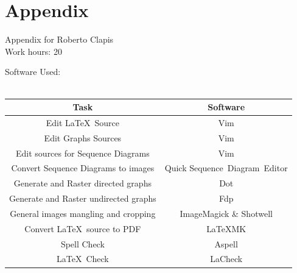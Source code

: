 \documentclass{article}
\begin{document}
\section{Appendix}
Appendix for Roberto Clapis\\
Work hours: 20
\begin{center}
	Software Used:\\
	\-\\
	\begin{tabular}{*{2}{c}}
		\toprule
		Task & Software \\
		\midrule
		Edit \LaTeX\ Source & Vim\\
		Edit Graphs Sources & Vim\\
		Edit sources for Sequence Diagrams & Vim\\
		Convert Sequence Diagrams to images & Quick Sequence Diagram Editor\\
		Generate and Raster directed graphs& Dot\\
		Generate and Raster undirected graphs& Fdp\\
		General images mangling and cropping & ImageMagick \& Shotwell\\
		Convert \LaTeX\ source to PDF & \LaTeX\-MK\\
		Spell Check & Aspell \\
		\LaTeX\ Check & LaCheck\\
		\bottomrule
	\end{tabular}
\end{center}
\-\\
\-\\

\end{document}
